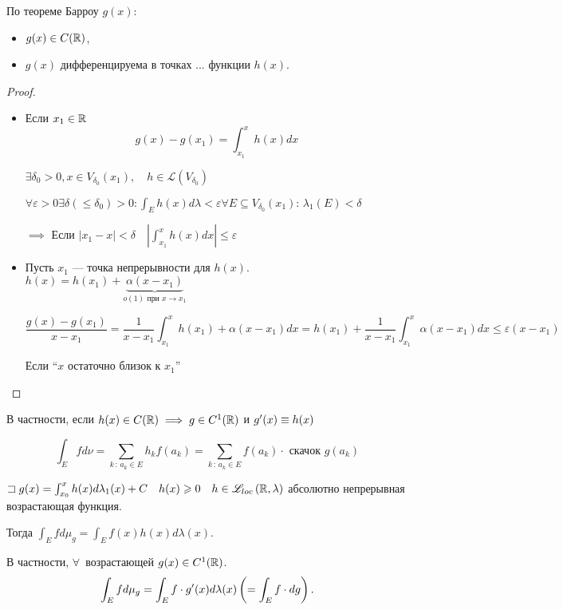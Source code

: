 По теореме Барроу $g(x)$:
\begin{itemize}
    \item $g(x)\in C(\mathbb{R})$,
    \item $g(x)$ дифференцируема в точках ... функции $h(x)$. 
\end{itemize}

\begin{proof}
\begin{itemize}
    \item  Если $x_1\in \mathbb{R}$ \[g(x) - g(x_1) = \int_{x_1}^x h(x)dx\]

$\exists \delta_0 >0, x\in V_{\delta_0}(x_1), \quad h\in \mathscr L\left( V_{\delta_0} \right) $

$\forall \varepsilon >0 \exists \delta (\leqslant \delta_0 ) >0 : \int_E h(x)d\lambda  < \varepsilon \forall E\subseteq V_{\delta_0}(x_1):\, \lambda_1(E) <\delta$

$\implies $ Если  $\left| x_1 - x \right| <\delta\quad \left| \int_{x_1}^x h(x)dx \right| \leqslant \varepsilon$

\item Пусть $x_1$ --- точка непрерывности для $h(x)$. $h(x) = h(x_1) + \underbrace{ \alpha (x - x_1)}_{o(1) \text{ при } x\to x_1 }$

\[ \dfrac{g(x) - g(x_1)}{x - x_1} = \frac{1}{x - x_1} \int_{x_1}^x h(x_1) + \alpha(x-x_1)dx = h(x_1) + \frac{1}{x - x_1} \int_{x_1}^x \alpha(x - x_1)dx \leqslant \varepsilon(x - x_1)\]

Если ``$x$ остаточно близок к $x_1$''
\end{itemize}
\end{proof}

\begin{note}
    В частности, если $h(x) \in C(\mathbb{R}) \implies g\in C^1(\mathbb{R})$ и $g^{\prime}(x)\equiv h(x)$    
\end{note}

\begin{note}
    \[\int_E fd\nu = \sum_{k\,:\,a_k\in E} h_k f(a_k) = \sum_{k\,:\,a_k\in E} f(a_k) \cdot \text{ скачок } g(a_k)\]  
\end{note}

\begin{statement}
    $\sqsupset g(x) = \int_{x_0}^x h(x)d\lambda_1(x) +C\quad h(x) \geqslant 0\quad h\in \mathscr{L}_{loc}\left(  \mathbb{R}, \lambda\right) $     абсолютно непрерывная возрастающая функция.
  
    Тогда $\int_E f d \mu_g = \int_E f(x) h(x) d \lambda (x)$.

    В частности, $\forall$~возрастающей $g(x) \in C^{1} (\mathbb{R})$.
    \[\int_E f d\mu_g = \int_E f \cdot g^{\prime} (x) d \lambda(x) \left( = \int_E f \cdot dg \right). \]
\end{statement}

